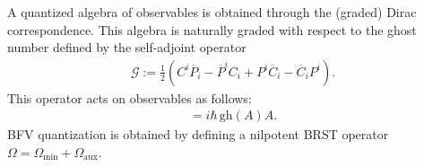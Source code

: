     A quantized algebra of observables is obtained through the (graded) Dirac correspondence. This algebra is naturally graded with respect to the ghost number defined by the self-adjoint operator
    \begin{gather}
        \mathcal{G} := \frac{1}{2}\left(C^i\overline{P}_i - \overline{P}^iC_i + P^i\overline{C}_i - \overline{C}_iP^i\right).
    \end{gather}
    This operator acts on observables as follows:
    \begin{gather}
        [\mathcal{G},A] = i\hbar\,\mathrm{gh}(A)A.
    \end{gather}
    BFV quantization is obtained by defining a nilpotent BRST operator $\Omega=\Omega_\mathrm{min}+\Omega_\mathrm{aux}$.